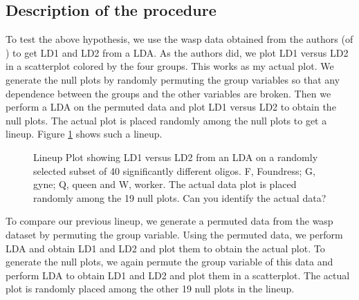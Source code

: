 \documentclass[12]{article}
\begin{document}
\subsection{Description of the procedure}

To test the above hypothesis, we use the wasp data obtained from the authors (of \cite{toth:2010}) to get LD1 and LD2 from a LDA. As the authors did, we plot LD1 versus LD2 in a scatterplot colored by the four groups. This works as my actual plot. We generate the null plots by randomly permuting the group variables so that any dependence between the groups and the other variables are broken. Then we perform a LDA on the permuted data and plot LD1 versus LD2 to obtain the null plots. The actual plot is placed randomly among the null plots to get a lineup. Figure \ref{toth_lineup} shows such a lineup.


\begin{figure}[hbtp]
   \centering
       \caption{Lineup Plot showing LD1 versus LD2 from an LDA on a randomly selected subset of 40 significantly different oligos. F, Foundress; G, gyne; Q, queen and W, worker. The actual data plot is placed randomly among the 19 null plots. Can you identify the actual data?  }
       \label{toth_lineup}
\end{figure} 

To compare our previous lineup, we generate a permuted data from the wasp dataset by permuting the group variable. Using the permuted data, we perform LDA and obtain LD1 and LD2 and plot them to obtain the actual plot. To generate the null plots, we again permute the group variable of this data and perform LDA to obtain LD1 and LD2 and plot them in a scatterplot. The actual plot is randomly placed among the other 19 null plots in the lineup. 
\end{document}

